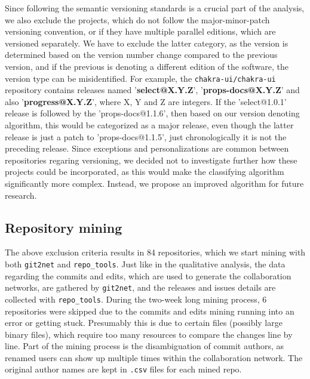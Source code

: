 Since following the semantic versioning standards is a crucial part of the analysis, we also exclude the projects, which do not follow the major-minor-patch versioning convention, or if they have multiple parallel editions, which are versioned separately. We have to exclude the latter category, as the version is determined based on the version number change compared to the previous version, and if the previous is denoting a different edition of the software, the version type can be misidentified. For example, the \texttt{chakra-ui/chakra-ui} repository contains releases named '\textbf{select@X.Y.Z}', '\textbf{props-docs@X.Y.Z}' and also '\textbf{progress@X.Y.Z}', where X, Y and Z are integers. If the 'select@1.0.1' release is followed by the 'props-docs@1.1.6', then based on our version denoting algorithm, this would be categorized as a major release, even though the latter release is just a patch to 'props-docs@1.1.5', just chronologically it is not the preceding release. Since exceptions and personalizations are common between repositories regaring versioning, we decided not to investigate further how these projects could be incorporated, as this would make the classifying algorithm significantly more complex. Instead, we propose an improved algorithm for future research.

\subsection{Repository mining}

The above exclusion criteria results in 84 repositories, which we start mining with both \texttt{git2net} and \texttt{repo\_tools}. Just like in the qualitative analysis, the data regarding the commits and edits, which are used to generate the collaboration networks, are gathered by \texttt{git2net}, and the releases and issues details are collected with \texttt{repo\_tools}. During the two-week long mining process, 6 repositories were skipped due to the commits and edits mining running into an error or getting stuck. Presumably this is due to certain files (possibly large binary files), which require too many resources to compare the changes line by line. Part of the mining process is the disambiguation of commit authors, as renamed users can show up multiple times within the collaboration network. The original author names are kept in \texttt{.csv} files for each mined repo.

